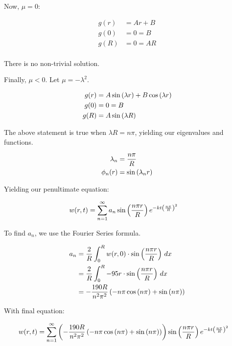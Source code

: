 \documentclass[10pt]{article}
\begin{document}
\begin{easylist}[enumerate]
    Now, $\mu = 0$:

    \begin{align*}
        g(r) &= Ar + B\\
        g(0) &= 0 = B\\
        g(R) &= 0 = AR\\
    \end{align*}

    There is no non-trivial solution.

    Finally, $\mu < 0$. Let $\mu = -\lambda^2$.

    \begin{align*}
        g(r) &= A \sin\left( \lambda r \right) + B \cos\left( \lambda r \right)\\
        g(0) &= 0 = B\\
        g(R) &= A \sin\left( \lambda R \right)\\
    \end{align*}

    The above statement is true when $\lambda R = n \pi$, yielding our eigenvalues and functions.

    \begin{align*}
        \lambda_n &= \frac{n\pi}{R}\\
        \phi_n(r) &= \sin\left( \lambda_n r \right)
    \end{align*}

    Yielding our penultimate equation:

    \begin{align*}
        w(r, t) &= \sum_{n=1}^\infty a_n \sin\left( \frac{n\pi r}{R} \right) e^{-kt \left( \frac{n\pi}{R} \right)^2}
    \end{align*}

    To find $a_n$, we use the Fourier Series formula.

    \begin{align*}
        a_n &= \frac{2}{R} \int_0^R w(r, 0) \cdot \sin\left( \frac{n\pi r}{R} \right) \, dx\\
        &= \frac{2}{R} \int_0^R -95r \cdot \sin\left( \frac{n\pi r}{R} \right) \, dx\\
        &= - \frac{190 R}{n^{2} \pi^{2}} \left(- n \pi \cos{\left (n \pi \right )} + \sin{\left (n \pi \right )}\right)
    \end{align*}

    With final equation:

    \begin{align*}
        w(r, t) &= \sum_{n=1}^\infty \left( - \frac{190 R}{n^{2} \pi^{2}} \left(- n \pi \cos{\left (n \pi \right )} + \sin{\left (n \pi \right )}\right) \right) \sin\left( \frac{n\pi r}{R} \right) e^{-kt \left( \frac{n\pi}{R} \right)^2}
    \end{align*}


\end{easylist}
\end{document}
